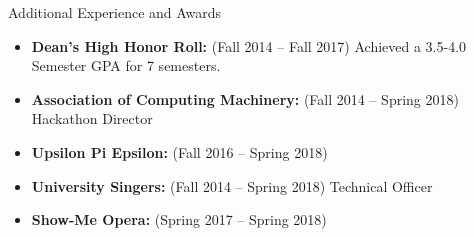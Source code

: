 \documentclass[]{mcdowellcv}
\begin{document}
    \begin{cvsection}{Additional Experience and Awards}
        \begin{cvsubsection}{}{}{}	
            \begin{itemize}
                \item \textbf{Dean's High Honor Roll:}  (Fall 2014 -- Fall 2017) Achieved a 3.5-4.0 Semester GPA for 7 semesters.
                \item \textbf{Association of Computing Machinery:} (Fall 2014 -- Spring 2018) Hackathon Director
                \item \textbf{Upsilon Pi Epsilon:}  (Fall 2016 -- Spring 2018)
                \item \textbf{University Singers:} (Fall 2014 -- Spring 2018) Technical Officer
                \item \textbf{Show-Me Opera:} (Spring 2017 -- Spring 2018)
            \end{itemize}
        \end{cvsubsection}
    \end{cvsection}
\end{document}

